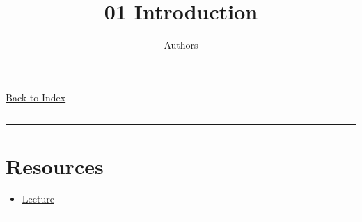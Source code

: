 \documentclass[letterpaper,10pt]{article}
\title{\textbf{01 Introduction}}
\author{Authors}
\newcommand{\panhline}{\begin{center}\rule{\textwidth}{1pt}\end{center}}
\begin{document}
\maketitle
\href{../index.html}{Back to Index}

\panhline
\tableofcontents
\panhline

\section*{Resources}

\begin{itemize}
	\item \href{../../Lectures/01_intro.pdf}{Lecture}
\end{itemize}

\panhline


	
\end{document}
